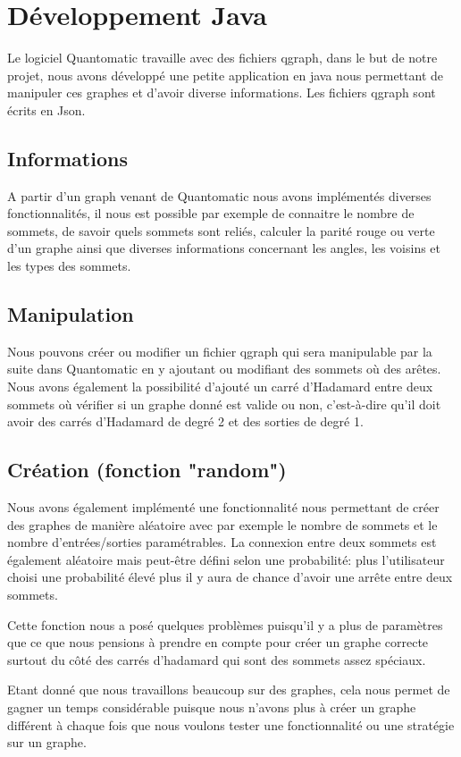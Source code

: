 \documentclass[a4paper,oneside]{book}
\begin{document}
\chapter{Développement Java}
\minitoc
Le logiciel Quantomatic travaille avec des fichiers qgraph, dans le but de notre projet, nous avons  développé une petite application en java nous permettant de manipuler ces graphes et d’avoir diverse informations. Les fichiers qgraph sont écrits en Json.

\section{Informations}
A partir d'un graph venant de Quantomatic nous avons implémentés diverses fonctionnalités, il nous est possible par exemple de connaitre le nombre de sommets, de savoir quels sommets sont reliés, calculer la parité rouge ou verte d'un graphe ainsi que diverses informations concernant les angles, les voisins et les types des sommets.

\section{Manipulation}
Nous pouvons créer ou modifier un fichier qgraph qui sera manipulable par la suite dans Quantomatic en y ajoutant ou modifiant des sommets où des arêtes. Nous avons également la possibilité d'ajouté un carré d'Hadamard entre deux sommets où vérifier si un graphe donné est valide ou non, c'est-à-dire qu'il doit avoir des carrés d'Hadamard de degré 2 et des sorties de degré 1.

\section{Création (fonction "random")}
Nous avons également implémenté une fonctionnalité nous permettant de créer des graphes de manière aléatoire avec par exemple le nombre de sommets et le nombre d'entrées/sorties paramétrables. La connexion entre deux sommets est également aléatoire mais peut-être défini selon une probabilité: plus l'utilisateur choisi une probabilité élevé plus il y aura de chance d'avoir une arrête entre deux sommets.

Cette fonction nous a posé quelques problèmes puisqu'il y a plus de paramètres que ce que nous pensions à prendre en compte pour créer un graphe correcte surtout du côté des carrés d'hadamard qui sont des sommets assez spéciaux.

Etant donné que nous travaillons beaucoup sur des graphes, cela nous permet de gagner un temps considérable puisque nous n'avons plus à créer un graphe différent à chaque fois que nous voulons tester une fonctionnalité ou une stratégie sur un graphe.
\end{document}
